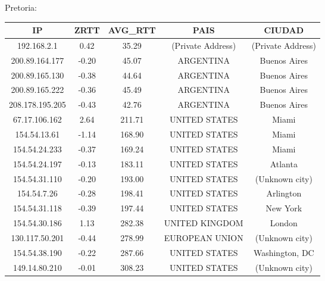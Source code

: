 \medskip

Pretoria:

\begin{tabular}{|c@{\hspace{5ex}}c@{\hspace{5ex}}c@{\hspace{5ex}}c@{\hspace{5ex}}c|}
 \hline
 \rule{0pt}{1.2em}IP & ZRTT & AVG\_RTT & PAIS & CIUDAD\\[0.2em]
 \hline

\rule{0pt}{1.2em} 192.168.2.1  &  0.42 & 35.29 & (Private Address) & (Private Address) \\[0.2em]
\rule{0pt}{1.2em} 200.89.164.177  &  -0.20 & 45.07 & ARGENTINA & Buenos Aires \\[0.2em]
\rule{0pt}{1.2em} 200.89.165.130  &  -0.38 & 44.64 & ARGENTINA & Buenos Aires \\[0.2em]
\rule{0pt}{1.2em} 200.89.165.222  &  -0.36 & 45.49 & ARGENTINA & Buenos Aires \\[0.2em]
\rule{0pt}{1.2em} 208.178.195.205  &  -0.43 & 42.76 & ARGENTINA & Buenos Aires \\[0.2em]
\rule{0pt}{1.2em} 67.17.106.162  &  2.64 & 211.71 & UNITED STATES & Miami \\[0.2em]
\rule{0pt}{1.2em} 154.54.13.61  &  -1.14 & 168.90 & UNITED STATES & Miami \\[0.2em]
\rule{0pt}{1.2em} 154.54.24.233  &  -0.37 & 169.24 & UNITED STATES & Miami \\[0.2em]
\rule{0pt}{1.2em} 154.54.24.197  &  -0.13 & 183.11 & UNITED STATES & Atlanta \\[0.2em]
\rule{0pt}{1.2em} 154.54.31.110  &  -0.20 & 193.00 & UNITED STATES & (Unknown city) \\[0.2em]
\rule{0pt}{1.2em} 154.54.7.26  &  -0.28 & 198.41 & UNITED STATES & Arlington \\[0.2em]
\rule{0pt}{1.2em} 154.54.31.118  &  -0.39 & 197.44 & UNITED STATES & New York \\[0.2em]
\rule{0pt}{1.2em} 154.54.30.186  &  1.13 & 282.38 & UNITED KINGDOM & London \\[0.2em]
\rule{0pt}{1.2em} 130.117.50.201  &  -0.44 & 278.99 & EUROPEAN UNION & (Unknown city) \\[0.2em]
\rule{0pt}{1.2em} 154.54.38.190  &  -0.22 & 287.66 & UNITED STATES & Washington, DC \\[0.2em]
\rule{0pt}{1.2em} 149.14.80.210  &  -0.01 & 308.23  & UNITED STATES & (Unknown city) \\[0.2em]

\end{tabular}
